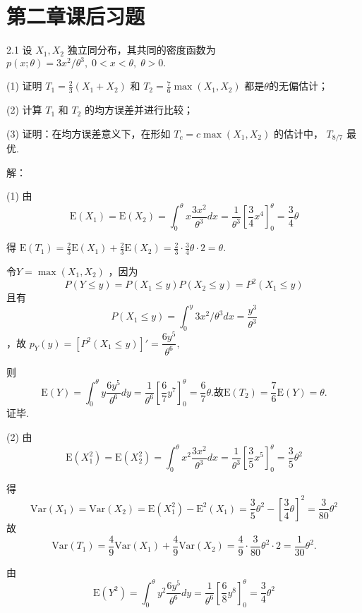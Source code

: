 \section{第二章课后习题}
\begin{example}
    2.1 设 $X_1,X_2$ 独立同分布，其共同的密度函数为 $p(x;\theta)=3x^2/\theta^3,\;0<x<\theta,\; \theta>0.$

    (1) 证明 $T_1=\frac{2}{3}(X_1+X_2)$ 和 $T_2=\frac{7}{6} \max(X_1,X_2)$ 都是$ \theta $的无偏估计；

    (2) 计算 $T_1$ 和 $T_2$ 的均方误差并进行比较；

    (3) 证明：在均方误差意义下，在形如 $T_c=c \max(X_1,X_2)$ 的估计中， $T_{8/7}$ 最优.

    解：

    (1) 由
    \[
        \text{E}(X_1)=\text{E}(X_2)=\int_{0}^{\theta}x\frac{3x^2}{\theta^3}dx=\frac{1}{\theta^3}\left[ \frac{3}{4}x^4\right]^{\theta}_{0}=\frac{3}{4}\theta
    \]

    得 $\text{E}(T_1)=\frac{2}{3}\text{E}(X_1)+\frac{2}{3}\text{E}(X_2)=\frac{2}{3} \cdot \frac{3}{4}\theta \cdot 2= \theta.$

    令$ Y=\max(X_1,X_2)$ ，因为 
    \[
        P(Y \leqslant y)=P(X_1 \leqslant y)P(X_2 \leqslant y)=P^2(X_1 \leqslant y)
    \]
    且有 
    \[
        P(X_1 \leqslant y)=\int_{0}^{y}3x^2/\theta^3dx=\frac{y^3}{\theta^3}
    \] ，故 $p_Y(y)=[P^2(X_1 \leqslant y)]'=\dfrac{6y^5}{\theta^6},$

    则 
    \[
        \text{E}(Y)=\int_{0}^{\theta} y \frac{6y^5}{\theta^6} dy= \frac{1}{\theta^6}\left[ \frac{6}{7}y^7 \right]_0^{\theta}= \frac{6}{7}\theta. 故 \text{E}(T_2)=\frac{7}{6}\text{E}(Y)=\theta . 
    \]证毕.

    (2) 由 
    \[
        \text{E}(X_1^2)=\text{E}(X_2^2)=\int_{0}^{\theta}x^2\frac{3x^2}{\theta^3}dx=\frac{1}{\theta^3}\left[ \frac{3}{5}x^5\right]^{\theta}_{0}=\frac{3}{5}\theta^2
    \]

    得 
    \[
        \text{Var}(X_1)=\text{Var}(X_2)=\text{E}(X_1^2)-\text{E}^2(X_1)=\frac{3}{5}\theta^2-\left[ \frac{3}{4}\theta \right]^2=\frac{3}{80}\theta^2
    \]
    故 
    \[
        \text{Var}(T_1)=\frac{4}{9}\text{Var}(X_1)+\frac{4}{9}\text{Var}(X_2)=\frac{4}{9} \cdot \frac{3}{80}\theta^2 \cdot 2=\frac{1}{30}\theta^2.
    \]

    由 
    \[
        \text{E}(Y^2)=\int_{0}^{\theta}y^2\frac{6y^5}{\theta^6}dy=\frac{1}{\theta^6}\left[ \frac{6}{8}y^8\right]^{\theta}_{0}=\frac{3}{4}\theta^2
    \]


\end{example}
